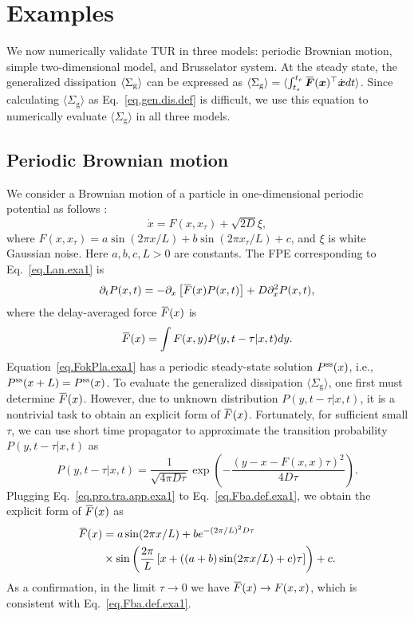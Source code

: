 \documentclass[pre,
twocolumn,
]{revtex4-1}
\newcommand{\overbar}[1]{\mkern 1.5mu\overline{\mkern-1.5mu#1\mkern-1.5mu}\mkern 1.5mu}
\theoremstyle{definition}
\theoremstyle{definition}
\newcommand{\bol}{\boldsymbol}
\newcommand{\mrm}{\mathrm}
\newcommand{\eq}[1]{\begin{equation}#1\end{equation}}
\newcommand{\al}[1]{\begin{align}#1\end{align}}
\newcommand{\avg}[1]{\langle #1\rangle}
\newcommand{\inl}[1]{$ #1 $}
\newcommand{\bra}[1]{\left( #1 \right)}
\newcommand{\bras}[1]{\left[ #1 \right]}
\begin{document}
\section{Examples}
We now numerically validate TUR in three models: periodic Brownian motion, simple two-dimensional model, and Brusselator system.
At the steady state, the generalized dissipation \inl{\avg{\Sigma_{\rm g}}} can be expressed as \inl{\avg{\Sigma_{\mrm{g}}}=\avg{\int_{t_s}^{t_e}\overbar{\bol{F}}(\bol{x})^\top\dot{\bol{x}}dt}}.
Since calculating \inl{\avg{\Sigma_{\mrm{g}}}} as Eq.~\eqref{eq.gen.dis.def} is difficult, we use this equation to numerically evaluate \inl{\avg{\Sigma_{\mrm{g}}}} in all three models.

\subsection{Periodic Brownian motion}
We consider a Brownian motion of a particle in one-dimensional periodic potential as follows \cite{Juniper.2016.PRE}:
\eq{
\dot{x}=F(x,x_{\tau})+\sqrt{2D}\xi,\label{eq.Lan.exa1}
}
where \inl{F(x,x_\tau)=a\sin\bra{2\pi x/L}+b\sin\bra{2\pi x_\tau/L}+c}, and \inl{\xi} is white Gaussian noise.
Here \inl{a,b,c,L>0} are constants.
The FPE corresponding to Eq.~\eqref{eq.Lan.exa1} is
\eq{
\partial_tP(x,t)=-\partial_x\bras{\overbar{F}(x)P(x,t)}+D\partial_x^2P(x,t),\label{eq.FokPla.exa1}
}
where the delay-averaged force \inl{\overbar{F}(x)} is
\eq{
\overbar{F}(x)=\int F(x,y)P(y,t-\tau|x,t)dy.\label{eq.Fba.def.exa1}
}
Equation~\eqref{eq.FokPla.exa1} has a periodic steady-state solution \inl{P^{\rm ss}(x)}, i.e., \inl{P^{\rm ss}(x+L)=P^{\rm ss}(x)}.
To evaluate the generalized dissipation \inl{\avg{\Sigma_{\mrm{g}}}}, one first must determine \inl{\overbar{F}(x)}.
However, due to unknown distribution \inl{P(y,t-\tau|x,t)}, it is a nontrivial task to obtain an explicit form of \inl{\overbar{F}(x)}.
Fortunately, for sufficient small \inl{\tau}, we can use short time propagator to approximate the transition probability \inl{P(y,t-\tau|x,t)} as \cite{Risken.1989,Frank.2005.PRE}
\eq{
P(y,t-\tau|x,t)=\frac{1}{\sqrt{4\pi D\tau}}\exp\bra{-\frac{(y-x-F(x,x)\tau)^2}{4D\tau}}.\label{eq.pro.tra.app.exa1}
}
Plugging Eq.~\eqref{eq.pro.tra.app.exa1} to Eq.~\eqref{eq.Fba.def.exa1}, we obtain the explicit form of \inl{\overbar{F}(x)} as
\al{
\overbar{F}(x)&=a\sin(2\pi x/L)+be^{-(2\pi/L)^2D\tau}\nonumber\\
&\times\sin\bra{\frac{2\pi}{L}\bras{x+((a+b)\sin(2\pi x/L)+c)\tau}}+c.\label{eq.Fba.ana.exa1}
}
As a confirmation, in the limit \inl{\tau\to 0} we have \inl{\overbar{F}(x)\to F(x,x)}, which is consistent with Eq.~\eqref{eq.Fba.def.exa1}.
\end{document}
